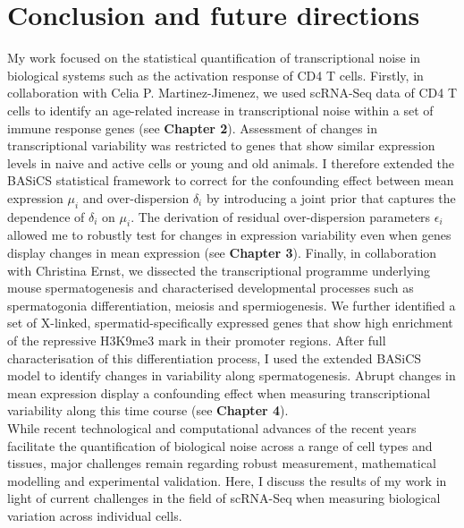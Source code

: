 
\graphicspath{{"../../Dropbox (Cambridge  University)/Figures_for_thesis/Discussion/"}}

\chapter{Conclusion and future directions}  

My work focused on the statistical quantification of transcriptional noise in biological systems such as the activation response of CD4\plus{} T cells. Firstly, in collaboration with Celia P. Martinez-Jimenez, we used scRNA-Seq data of CD4\plus{} T cells to identify an age-related increase in transcriptional noise within a set of immune response genes (see \textbf{Chapter 2}). Assessment of changes in transcriptional variability was restricted to genes that show similar expression levels in naive and active cells or young and old animals. I therefore extended the BASiCS statistical framework to correct for the confounding effect between mean expression $\mu_i$ and over-dispersion $\delta_i$ by introducing a joint prior that captures the dependence of $\delta_i$ on $\mu_i$. The derivation of residual over-dispersion parameters $\epsilon_i$ allowed me to robustly test for changes in expression variability even when genes display changes in mean expression (see \textbf{Chapter 3}). Finally, in collaboration with Christina Ernst, we dissected the transcriptional programme underlying mouse spermatogenesis and characterised developmental processes such as spermatogonia differentiation, meiosis and spermiogenesis. We further identified a set of X-linked, spermatid-specifically expressed genes that show high enrichment of the repressive H3K9me3 mark in their promoter regions. After full characterisation of this differentiation process, I used the extended BASiCS model to identify changes in variability along spermatogenesis.   Abrupt changes in mean expression display a confounding effect when measuring transcriptional variability along this time course (see \textbf{Chapter 4}).  \\

While recent technological and computational advances of the recent years facilitate the quantification of biological noise across a range of cell types and tissues, major challenges remain regarding robust measurement, mathematical modelling and experimental validation. Here, I discuss the results of my work in light of current challenges in the field of scRNA-Seq when measuring biological variation across individual cells.

